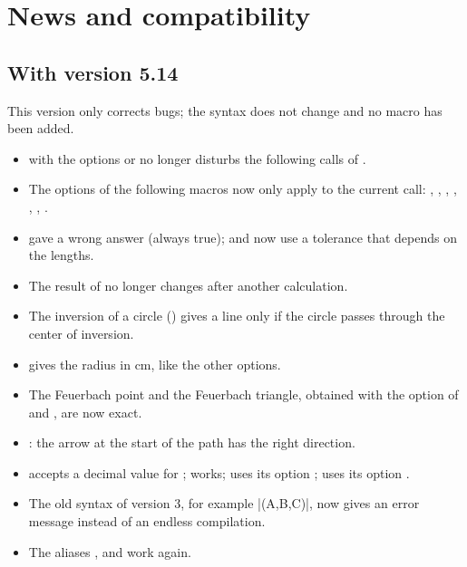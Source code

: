 \section{News and compatibility}\label{news}

\subsection{With version 5.14}
\begingroup\sloppy

This version only corrects bugs; the syntax does not change and no macro has been added.

\begin{itemize}
  \item {} with the options  or  no longer disturbs the following calls of .
  \item The options of the following macros now only apply to the current call: , , , , , , .
  \item {} gave a wrong answer (always true);  and  now use a tolerance that depends on the lengths.
  \item The result of  no longer changes after another calculation.
  \item The inversion of a circle () gives a line only if the circle passes through the center of inversion.
  \item {}\code{[spieker]} gives the radius in cm, like the other options.
  \item The Feuerbach point and the Feuerbach triangle, obtained with the option  of  and , are now exact.
  \item {}: the arrow at the start of the path has the right direction.
  \item {} accepts a decimal value for ; \code{[return]} works;  uses its option ;  uses its option .
  \item The old syntax of version 3, for example |\tkzDrawCircle[euler](A,B,C)|, now gives an error message instead of an endless compilation.
  \item The aliases ,  and  work again.
\end{itemize}

